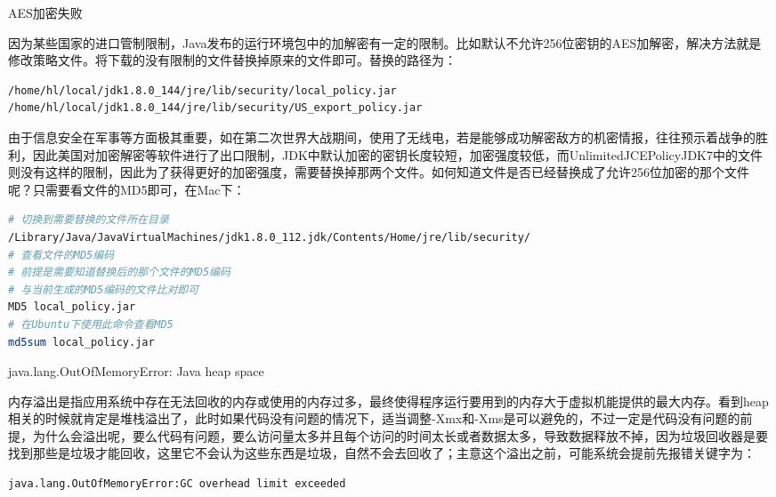 \documentclass[12pt]{book}
\makeatletter
\numberwithin{dummy}{section}
\theoremstyle{ocrenumbox}
\theoremstyle{blacknumex}
\theoremstyle{blacknumbox}
\theoremstyle{ocrenum}
\renewcommand{\subsection}{\@startsection {subsection}{2}{\z@}
	{-3ex \@plus -0.1ex \@minus -.4ex}
	{0.5ex \@plus.2ex }
	{\normalfont\sffamily\bfseries}}
\renewcommand\paragraph{\@startsection{paragraph}{4}{\z@}
	{-2ex \@plus-.2ex \@minus .2ex}
	{.1ex}
	{\normalfont\small\sffamily\bfseries}}
\makeatother
\begin{document}
\paragraph{AES加密失败}

因为某些国家的进口管制限制，Java发布的运行环境包中的加解密有一定的限制。比如默认不允许256位密钥的AES加解密，解决方法就是修改策略文件。将下载的没有限制的文件替换掉原来的文件即可。替换的路径为：

\begin{lstlisting}[language=Bash]
/home/hl/local/jdk1.8.0_144/jre/lib/security/local_policy.jar
/home/hl/local/jdk1.8.0_144/jre/lib/security/US_export_policy.jar
\end{lstlisting}

由于信息安全在军事等方面极其重要，如在第二次世界大战期间，使用了无线电，若是能够成功解密敌方的机密情报，往往预示着战争的胜利，因此美国对加密解密等软件进行了出口限制，JDK中默认加密的密钥长度较短，加密强度较低，而UnlimitedJCEPolicyJDK7中的文件则没有这样的限制，因此为了获得更好的加密强度，需要替换掉那两个文件。如何知道文件是否已经替换成了允许256位加密的那个文件呢？只需要看文件的MD5即可，在Mac下：

\begin{lstlisting}[language=Bash]
# 切换到需要替换的文件所在目录
/Library/Java/JavaVirtualMachines/jdk1.8.0_112.jdk/Contents/Home/jre/lib/security/
# 查看文件的MD5编码
# 前提是需要知道替换后的那个文件的MD5编码
# 与当前生成的MD5编码的文件比对即可
MD5 local_policy.jar
# 在Ubuntu下使用此命令查看MD5
md5sum local_policy.jar
\end{lstlisting}

\subsection{java.lang.OutOfMemoryError: Java heap space	}

内存溢出是指应用系统中存在无法回收的内存或使用的内存过多，最终使得程序运行要用到的内存大于虚拟机能提供的最大内存。看到heap相关的时候就肯定是堆栈溢出了，此时如果代码没有问题的情况下，适当调整-Xmx和-Xms是可以避免的，不过一定是代码没有问题的前提，为什么会溢出呢，要么代码有问题，要么访问量太多并且每个访问的时间太长或者数据太多，导致数据释放不掉，因为垃圾回收器是要找到那些是垃圾才能回收，这里它不会认为这些东西是垃圾，自然不会去回收了；主意这个溢出之前，可能系统会提前先报错关键字为：

\begin{lstlisting}
java.lang.OutOfMemoryError:GC overhead limit exceeded
\end{lstlisting}
\end{document}
